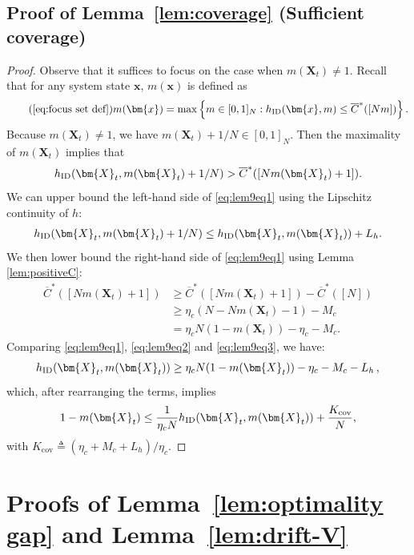 \documentclass{article}
\theoremstyle{plain}
\theoremstyle{remark}
\newcommand{\mx}{\bm{x}}
\newcommand{\ID}{\textnormal{ID}}
\newcommand{\cov}{\text{cov}}
\newcommand{\rembud}{\overline{C}^*} %
\def\mX{{\bm{X}}}
\newcommand{\sets}[1]{\left\{ #1 \right\}}
\begin{document}
\subsection{Proof of Lemma~\ref{lem:coverage} (Sufficient coverage)}
\begin{proof}
    Observe that it suffices to focus on the case when $m(\mX_t) \neq 1$. 
    Recall that for any system state $\mx$, $m(\mx)$ is defined as 
    \begin{align}\tag{\ref{eq:focus set def}}
        m(\mx)= \max \sets{ m\in[0,1]_N: h_{\ID}(\mx,m)\leq \rembud([Nm])}. 
    \end{align}
    Because $m(\mX_t) \neq 1$, we have $m(\mX_t)+1/N  \in [0,1]_N$. Then the maximality of $m(\mX_t)$ implies that
    \begin{equation}
    \label{eq:lem9eq1}
        h_{\ID}(\mX_t,m(\mX_t)+1/N) > \rembud([Nm(\mX_t)+1]). 
    \end{equation}
    We can upper bound the left-hand side of \eqref{eq:lem9eq1} using the Lipschitz continuity of $h$:
    \begin{align}\label{eq:lem9eq2}
        h_{\ID}(\mX_t,m(\mX_t)+1/N)\leq h_{\ID}(\mX_t,m(\mX_t)) + L_h.
    \end{align}
    We then lower bound the right-hand side of \eqref{eq:lem9eq1} using Lemma \ref{lem:positiveC}: 
    \begin{align}
        \nonumber
        \rembud([Nm(\mX_t)+1])
        &\geq  \rembud([Nm(\mX_t)+1]) - \rembud([N])\\ 
        \nonumber
        &\geq \eta_c(N-Nm(\mX_t)-1)-M_c \\
        \label{eq:lem9eq3}
        &=\eta_c N(1-m(\mX_t))-\eta_c - M_c. 
    \end{align}
    Comparing \eqref{eq:lem9eq1}, \eqref{eq:lem9eq2} and \eqref{eq:lem9eq3}, we have:
    \begin{align*}
        h_{\ID}(\mX_t,m(\mX_t))\geq \eta_c N(1-m(\mX_t))-\eta_c - M_c - L_h\,,
    \end{align*}
    which, after rearranging the terms, implies
    \begin{align*}
        1-m(\mX_t)\leq \frac{1}{\eta_c N}h_{\ID}(\mX_t,m(\mX_t))+\frac{K_{\cov}}{N}, 
    \end{align*}
    with $K_{\cov} \triangleq (\eta_c+M_c+L_h)/\eta_c$.
\end{proof}





\section{Proofs of Lemma~\ref{lem:optimality gap} and Lemma~\ref{lem:drift-V}}
\label{sec:proof-lem-main-theorem}
\end{document}
